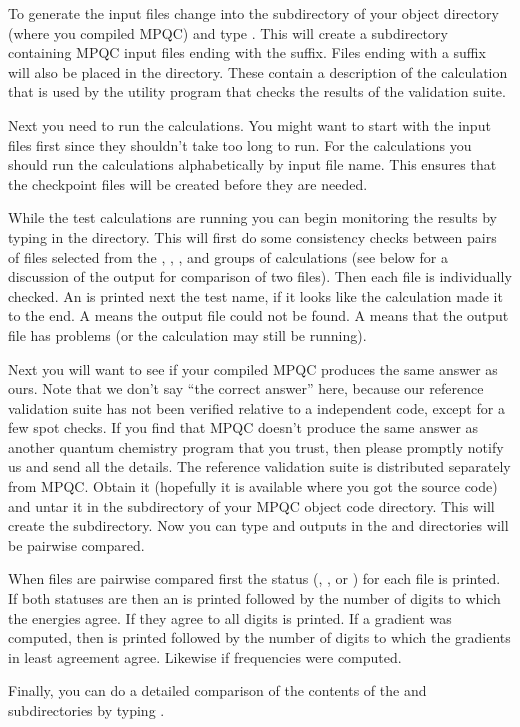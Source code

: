   To generate the input files change into the 
subdirectory of your object directory (where you compiled MPQC) and type
.  This will create a  subdirectory containing
MPQC input files ending with the  suffix.  Files ending with a
 suffix will also be placed in the  directory.
These contain a description of the calculation that is used by the utility
program that checks the results of the validation suite.

  Next you need to run the calculations.  You might want to start with the
 input files first since they shouldn't take too long to run.
For the  calculations you should run the calculations
alphabetically by input file name.  This ensures that the checkpoint files
will be created before they are needed.

  While the test calculations are running you can begin monitoring the
results by typing  in the 
directory.  This will first do some consistency checks between pairs of
files selected from the , , , and
 groups of calculations (see below for a discussion of the
output for comparison of two files).  Then each file is individually
checked.  An  is printed next the test name, if it looks like the
calculation made it to the end.  A  means the output file
could not be found.  A  means that the output file has
problems (or the calculation may still be running).

  Next you will want to see if your compiled MPQC produces the same answer
as ours.  Note that we don't say ``the correct answer'' here, because our
reference validation suite has not been verified relative to a independent
code, except for a few spot checks.  If you find that MPQC doesn't produce
the same answer as another quantum chemistry program that you trust, then
please promptly notify us and send all the details.  The reference
validation suite is distributed separately from MPQC.  Obtain it (hopefully
it is available where you got the source code) and untar it in the
 subdirectory of your MPQC object code
directory.  This will create the  subdirectory.  Now you can
type  and outputs in the  and 
directories will be pairwise compared.

  When files are pairwise compared first the status (,
, or ) for each file is printed.  If both
statuses are  then an  is printed followed by the number
of digits to which the energies agree.  If they agree to all digits
 is printed.  If a gradient was computed, then  is
printed followed by the number of digits to which the gradients in least
agreement agree.  Likewise if frequencies were computed.

  Finally, you can do a detailed comparison of the contents of the
 and  subdirectories by typing .

